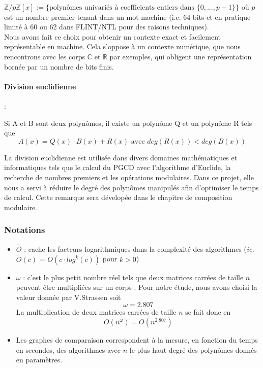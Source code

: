 \documentclass[a4paper]{article}
\begin{document}
${\mathbb{Z}/p \mathbb{Z}}[x] := \{\text{polynômes univariés à coefficients entiers dans }\{0,...,p-1\}\}$ où $p$ est un nombre premier tenant dans un mot machine (i.e. 64 bits et en pratique limité à 60 ou 62 dans FLINT/NTL pour des raisons techniques). \\

Nous avons fait ce choix pour obtenir un contexte exact et facilement représentable en machine. 
Cela s'oppose à un contexte numérique, que nous rencontrons avec les corps $\mathbb{C}$ et $\mathbb{R}$ par exemples, qui obligent une représentation bornée par un nombre de bits finis.	

\paragraph{Division euclidienne} :

Si A et B sont deux polynômes, il existe un polynôme Q et un polynôme R tels que  
\[
A(x) = Q(x)\cdot B(x) + R(x) \text{ avec } deg(R(x)) < deg(B(x))
\]

La division euclidienne est utilisée dans divers domaines mathématiques et informatiques tels que le calcul du PGCD avec l'algorithme d'Euclide, la recherche de nombres premiers et les opérations modulaires. 
Dans ce projet, elle nous a servi à réduire le degré des polynômes manipulés afin d'optimiser le temps de calcul. Cette remarque sera dévelopée dans le chapitre de composition modulaire.


\subsubsection*{Notations}
\begin{itemize}
    \item $\tilde{O}$ : cache les facteurs logarithmiques dans la complexité des algorithmes (\textit{ie.} $\tilde{O}(c)$ = $O(c\cdot log^{k}(c))$ pour $k>0$)
    \item $\omega$ : c'est le plus petit nombre réel tels que deux matrices carrées de taille $n$ peuvent être multipliées sur un corps \cite{STRASSEN1969}. 
    Pour notre étude, nous avons choisi la valeur donnée par V.Strassen soit $$\omega=2.807$$
    La multiplication de deux matrices carrées de taille $n$ se fait donc en $$O(n^\omega)=O(n^{2.807})$$
    \item Les graphes de comparaison correspondent à la mesure, en fonction du temps en secondes, des algorithmes avec $n$ le plus haut degré des polynômes donnés en paramètres.
\end{itemize}
\end{document}
